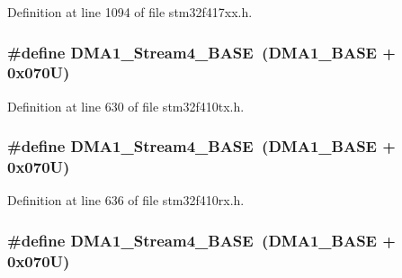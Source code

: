 Definition at line 1094 of file stm32f417xx.\+h.

\subsubsection[{\texorpdfstring{D\+M\+A1\+\_\+\+Stream4\+\_\+\+B\+A\+SE}{DMA1_Stream4_BASE}}]{\setlength{\rightskip}{0pt plus 5cm}\#define D\+M\+A1\+\_\+\+Stream4\+\_\+\+B\+A\+SE~({\bf D\+M\+A1\+\_\+\+B\+A\+SE} + 0x070\+U)}\hypertarget{group___peripheral__registers__structures_ga757a3c0d866c0fe68c6176156065a26b}{}\label{group___peripheral__registers__structures_ga757a3c0d866c0fe68c6176156065a26b}


Definition at line 630 of file stm32f410tx.\+h.

\subsubsection[{\texorpdfstring{D\+M\+A1\+\_\+\+Stream4\+\_\+\+B\+A\+SE}{DMA1_Stream4_BASE}}]{\setlength{\rightskip}{0pt plus 5cm}\#define D\+M\+A1\+\_\+\+Stream4\+\_\+\+B\+A\+SE~({\bf D\+M\+A1\+\_\+\+B\+A\+SE} + 0x070\+U)}\hypertarget{group___peripheral__registers__structures_ga757a3c0d866c0fe68c6176156065a26b}{}\label{group___peripheral__registers__structures_ga757a3c0d866c0fe68c6176156065a26b}


Definition at line 636 of file stm32f410rx.\+h.

\subsubsection[{\texorpdfstring{D\+M\+A1\+\_\+\+Stream4\+\_\+\+B\+A\+SE}{DMA1_Stream4_BASE}}]{\setlength{\rightskip}{0pt plus 5cm}\#define D\+M\+A1\+\_\+\+Stream4\+\_\+\+B\+A\+SE~({\bf D\+M\+A1\+\_\+\+B\+A\+SE} + 0x070\+U)}\hypertarget{group___peripheral__registers__structures_ga757a3c0d866c0fe68c6176156065a26b}{}\label{group___peripheral__registers__structures_ga757a3c0d866c0fe68c6176156065a26b}


